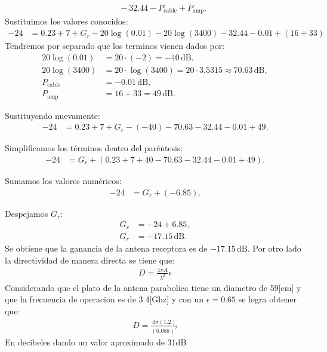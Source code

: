 \begin{itemize}
\begin{align*}
			&\quad - 32.44 - P_{\text{cable}} + P_{\text{amp}}.
		\end{align*}
			Sustituimos los valores conocidos:
			\begin{align}
			-24 &= 0.23 + 7 + G_r - 20 \log(0.01) - 20 \log(3400) - 32.44 - 0.01 + (16 + 33)
			\end{align}
			Tendremos por separado que los terminos vienen dados por:
			\begin{align}
			20 \log(0.01) &= 20 \cdot (-2) = -40 \, \text{dB}, \\
			20 \log(3400) &= 20 \cdot \log(3400) = 20 \cdot 3.5315 \approx 70.63 \, \text{dB}, \\
			P_{\text{cable}} &= -0.01 \, \text{dB}, \\
			P_{\text{amp}} &= 16 + 33 = 49 \, \text{dB}.
			\end{align}
			
			Sustituyendo nuevamente:
			\begin{align}
			-24 &= 0.23 + 7 + G_r - (-40) - 70.63 - 32.44 - 0.01 + 49.
			\end{align}
			
			Simplificamos los términos dentro del paréntesis:
			\begin{align}
			-24 &= G_r + (0.23 + 7 + 40 - 70.63 - 32.44 - 0.01 + 49).
			\end{align}
			
			Sumamos los valores numéricos:
			\begin{align}
			-24 &= G_r + (-6.85).
			\end{align}
			
			Despejamos \(G_r\):
			\begin{align}
			G_r &= -24 + 6.85, \\
			G_r &= -17.15 \, \text{dB}.
			\end{align}
			Se obtiene que la ganancia de la antena receptora es de \(-17.15 \, \text{dB}\). Por otro lado la directividad de manera directa se tiene que:
			\begin{align}
				D = \frac{4\pi A}{\lambda^{2}} \epsilon
			\end{align}
			Considerando que el plato de la antena parabolica tiene un diametro de 59[cm] y que la frecuencia de operacion es de 3.4[Ghz] y con un $\epsilon =0.65$ se logra obtener que:
			\begin{align}
				D = \frac{4\pi (1.2)}{(0.088)^{2}} 
			\end{align}
			En decibeles dando un valor aproximado de 31dB

\end{itemize}


